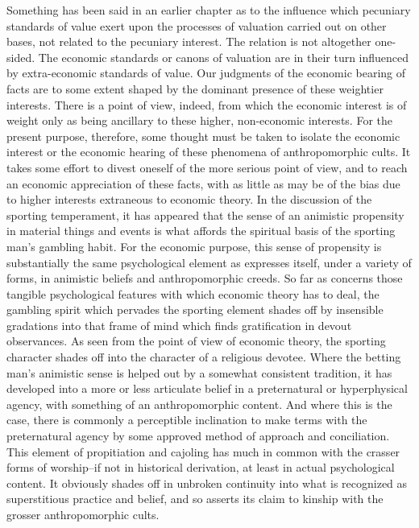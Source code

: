 \documentclass[12pt]{report}
\begin{document}
Something has been said in an earlier chapter as to the influence which
pecuniary standards of value exert upon the processes of valuation
carried out on other bases, not related to the pecuniary interest. The
relation is not altogether one-sided. The economic standards or canons
of valuation are in their turn influenced by extra-economic standards of
value. Our judgments of the economic bearing of facts are to some extent
shaped by the dominant presence of these weightier interests. There is
a point of view, indeed, from which the economic interest is of weight
only as being ancillary to these higher, non-economic interests. For the
present purpose, therefore, some thought must be taken to isolate
the economic interest or the economic hearing of these phenomena of
anthropomorphic cults. It takes some effort to divest oneself of the
more serious point of view, and to reach an economic appreciation
of these facts, with as little as may be of the bias due to higher
interests extraneous to economic theory. In the discussion of the
sporting temperament, it has appeared that the sense of an animistic
propensity in material things and events is what affords the spiritual
basis of the sporting man's gambling habit. For the economic purpose,
this sense of propensity is substantially the same psychological element
as expresses itself, under a variety of forms, in animistic beliefs and
anthropomorphic creeds. So far as concerns those tangible psychological
features with which economic theory has to deal, the gambling spirit
which pervades the sporting element shades off by insensible gradations
into that frame of mind which finds gratification in devout observances.
As seen from the point of view of economic theory, the sporting
character shades off into the character of a religious devotee. Where
the betting man's animistic sense is helped out by a somewhat consistent
tradition, it has developed into a more or less articulate belief in
a preternatural or hyperphysical agency, with something of an
anthropomorphic content. And where this is the case, there is commonly
a perceptible inclination to make terms with the preternatural agency
by some approved method of approach and conciliation. This element of
propitiation and cajoling has much in common with the crasser forms
of worship--if not in historical derivation, at least in actual
psychological content. It obviously shades off in unbroken continuity
into what is recognized as superstitious practice and belief, and so
asserts its claim to kinship with the grosser anthropomorphic cults.
\end{document}
